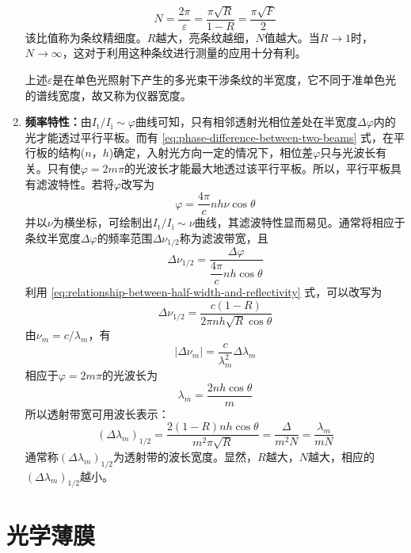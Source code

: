 \documentclass[cn,10pt,chinesefont=founder,math=mtpro2,cite=super,toc=onecol,twoside]{elegantbook}
\begin{document}
\begin{enumerate}
\begin{equation}
	N=\frac{2\pi}{\varepsilon}=\frac{\pi\sqrt{R}}{1-R}=\frac{\pi\sqrt{F}}{2}
	\end{equation}
	该比值称为条纹精细度。$R$越大，亮条纹越细，$N$值越大。当$R\rightarrow1$时，$N\rightarrow\infty$，这对于利用这种条纹进行测量的应用十分有利。
	\begin{note}
		上述$\varepsilon$是在单色光照射下产生的多光束干涉条纹的半宽度，它不同于准单色光的谱线宽度，故又称为仪器宽度。
	\end{note}
	\item \textbf{频率特性：}由$I_{\mathrm{t}}/I_{\mathrm{i}}\sim\varphi$曲线可知，只有相邻透射光相位差处在半宽度$\Delta\varphi$内的光才能透过平行平板。而有 \eqref{eq:phase-difference-between-two-beams} 式，在平行板的结构($n$，$h$)确定，入射光方向一定的情况下，相位差$\varphi$只与光波长有关。只有使$\varphi=2m\pi$的光波长才能最大地透过该平行平板。所以，平行平板具有滤波特性。若将$\varphi$改写为
	\begin{equation}
	\varphi=\frac{4\pi}{c}nh\nu\cos\theta
	\end{equation}
	并以$\nu$为横坐标，可绘制出$I_{\mathrm{t}}/I_{\mathrm{i}}\sim\nu$曲线，其滤波特性显而易见。通常将相应于条纹半宽度$\Delta\varphi$的频率范围$\Delta\nu_{1/2}$称为滤波带宽，且
	\begin{equation}
	\Delta\nu_{1/2}=\frac{\Delta\varphi}{\dfrac{4\pi}{c}nh\cos\theta}
	\end{equation}
	利用 \eqref{eq:relationship-between-half-width-and-reflectivity} 式，可以改写为
	\begin{equation}
	\Delta\nu_{1/2}=\frac{c(1-R)}{2\pi nh\sqrt{R}\cos\theta}
	\end{equation}
	由$\nu_m=c/\lambda_m$，有
	\begin{equation}
	|\Delta\nu_m|=\frac{c}{\lambda^2_m}\Delta\lambda_m
	\end{equation}
	相应于$\varphi=2m\pi$的光波长为
	\begin{equation}
	\lambda_m=\frac{2nh\cos\theta}{m}
	\end{equation}
	所以透射带宽可用波长表示：
	\begin{equation}
	(\Delta\lambda_m)_{1/2}=\frac{2(1-R)nh\cos\theta}{m^2\pi\sqrt{R}}=\frac{\varDelta}{m^2N}=\frac{\lambda_m}{mN}
	\end{equation}
	通常称$(\Delta\lambda_m)_{1/2}$为透射带的波长宽度。显然，$R$越大，$N$越大，相应的$(\Delta\lambda_m)_{1/2}$越小。
\end{enumerate}

\section{光学薄膜}
\end{document}

